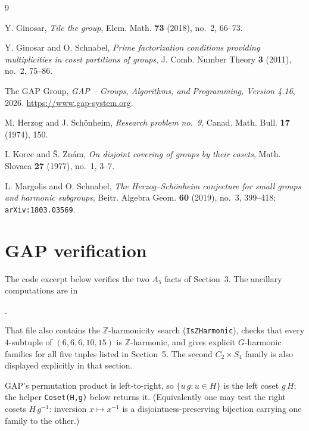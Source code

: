 \documentclass[12pt]{article}
\theoremstyle{remark}
\newcommand{\Z}{\mathbb{Z}}
\begin{document}
\begin{thebibliography}{9}

Y. Ginosar, \emph{Tile the group}, Elem. Math. \textbf{73} (2018), no.~2, 66--73.

Y. Ginosar and O. Schnabel, \emph{Prime factorization conditions providing multiplicities in coset partitions of groups}, J. Comb. Number Theory \textbf{3} (2011), no.~2, 75--86.

The GAP Group, \emph{GAP -- Groups, Algorithms, and Programming, Version 4.16}, 2026. \url{https://www.gap-system.org}.

M. Herzog and J. Sch\"onheim, \emph{Research problem no.~9}, Canad. Math. Bull. \textbf{17} (1974), 150.

I. Korec and \v{S}. Zn\'am, \emph{On disjoint covering of groups by their cosets}, Math. Slovaca \textbf{27} (1977), no.~1, 3--7.

L. Margolis and O. Schnabel, \emph{The Herzog--Sch\"onheim conjecture for small groups and harmonic subgroups}, Beitr. Algebra Geom. \textbf{60} (2019), no.~3, 399--418; \texttt{arXiv:1803.03569}.

\end{thebibliography}

\appendix
\section{GAP verification}

The code excerpt below verifies the two $A_5$ facts of Section~3. The ancillary
computations are in
\begin{center}
.
\end{center}
That file also contains the $\Z$-harmonicity search (\texttt{IsZHarmonic}),
checks that every $4$-subtuple of $(6,6,6,10,15)$ is $\Z$-harmonic, and gives
explicit $G$-harmonic families for all five tuples listed in Section~5. The
second $C_2\times S_4$ family is also displayed explicitly in that section.

GAP's permutation product is left-to-right, so $\{u\,g : u\in H\}$ is the left coset $g\,H$; the helper \texttt{Coset(H,g)} below returns it. (Equivalently one may test the right cosets $H\,g^{-1}$: inversion $x\mapsto x^{-1}$ is a disjointness-preserving bijection carrying one family to the other.)
\end{document}
